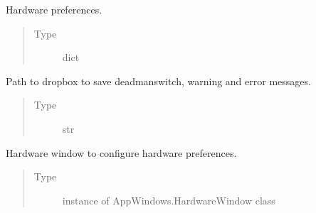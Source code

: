 \documentclass[letterpaper,10pt,english]{sphinxmanual}
\begin{document}
\begin{fulllineitems}
\begin{fulllineitems}
\end{fulllineitems}


\begin{fulllineitems}
\label{\detokenize{NoSeMazeControl/main:main.MainApp.hardware_prefs}}
\pysigstartsignatures
{}
\pysigstopsignatures
\sphinxAtStartPar
Hardware preferences.
\begin{quote}\begin{description}
\item[{Type}] \leavevmode
\sphinxAtStartPar
dict

\end{description}\end{quote}

\end{fulllineitems}


\begin{fulllineitems}
\label{\detokenize{NoSeMazeControl/main:main.MainApp.dropbox_path}}
\pysigstartsignatures
{}
\pysigstopsignatures
\sphinxAtStartPar
Path to dropbox to save deadman\sphinxhyphen{}switch, warning and error messages.
\begin{quote}\begin{description}
\item[{Type}] \leavevmode
\sphinxAtStartPar
str

\end{description}\end{quote}

\end{fulllineitems}


\begin{fulllineitems}
\label{\detokenize{NoSeMazeControl/main:main.MainApp.hardware_window}}
\pysigstartsignatures
{}
\pysigstopsignatures
\sphinxAtStartPar
Hardware window to configure hardware preferences.
\begin{quote}\begin{description}
\item[{Type}] \leavevmode
\sphinxAtStartPar
instance of AppWindows.HardwareWindow class


\end{description}
\end{quote}
\end{fulllineitems}
\end{fulllineitems}
\end{document}
